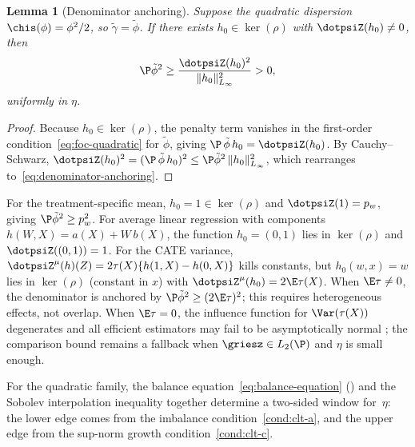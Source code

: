 \documentclass{article}
\newtheorem{lemma}[theorem]{Lemma}
\begin{document}
\begin{lemma}[Denominator anchoring]
\label{lem:denominator-anchoring}
Suppose the quadratic dispersion
$\chis(\phi) = \phi^2/2$,
so $\tilde\gamma = \tilde\phi$.
If there exists
$h_0 \in \ker(\rho)$
with $\dotpsiZ(h_0) \ne 0$,
then
\begin{equation}
\label{eq:denominator-anchoring}
\P\tilde\phi^2
  \ge \frac{\dotpsiZ(h_0)^2}
           {\|h_0\|_{L_\infty}^2}
  > 0,
\end{equation}
uniformly in $\eta$.
\end{lemma}

\begin{proof}
Because $h_0 \in \ker(\rho)$,
the penalty term vanishes
in the first-order condition~\eqref{eq:foc-quadratic}
for $\tilde\phi$,
giving
$\P\,\tilde\phi\, h_0
  = \dotpsiZ(h_0)$.
By Cauchy--Schwarz,
$\dotpsiZ(h_0)^2
  = (\P\,\tilde\phi\, h_0)^2
  \le \P\tilde\phi^2\,
      \|h_0\|_{L_\infty}^2$,
which rearranges
to~\eqref{eq:denominator-anchoring}.
\end{proof}

For the treatment-specific mean,
$h_0 = 1 \in \ker(\rho)$
and $\dotpsiZ(1) = p_w$,
giving $\P\tilde\phi^2 \ge p_w^2$.
For average linear regression
with components $h(W,X) = a(X) + W\,b(X)$,
the function $h_0 = (0,1)$
lies in $\ker(\rho)$
and $\dotpsiZ((0,1)) = 1$.
For the CATE variance,
$\dotpsiZ^\mu(h)(Z)
  = 2\tau(X)\{h(1,X) - h(0,X)\}$
kills constants,
but $h_0(w,x) = w$
lies in $\ker(\rho)$
(constant in $x$)
with $\dotpsiZ^\mu(h_0)
  = 2\E\tau(X)$.
When $\E\tau \ne 0$,
the denominator is anchored
by $\P\tilde\phi^2
  \ge (2\E\tau)^2$;
this requires
heterogeneous effects,
not overlap.
When $\E\tau = 0$,
the influence function for $\Var(\tau(X))$
degenerates
and all efficient estimators
may fail to be asymptotically normal
\citep{sanchez-becerra2023};
the comparison bound remains a fallback
when $\griesz \in L_2(\P)$
and $\eta$ is small enough.

For the quadratic family,
the balance equation~\eqref{eq:balance-equation}
()
and the Sobolev interpolation inequality
together determine a two-sided window
for~$\eta$:
the lower edge comes
from the imbalance condition~\ref{cond:clt-a},
and the upper edge
from the sup-norm growth condition~\ref{cond:clt-c}.
\end{document}
